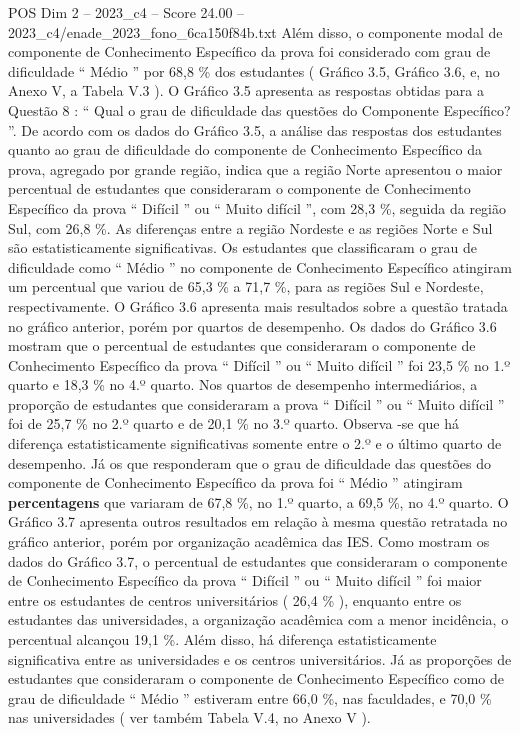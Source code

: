 \begin{textsample}{POS Dim 2 – 2023\_c4 – Score 24.00 – 2023\_c4/enade\_2023\_fono\_6ca150f84b.txt}
Além disso, o componente modal de componente de Conhecimento Específico da prova foi considerado com grau de dificuldade “ Médio ” por 68,8 \% dos estudantes ( Gráfico 3.5, Gráfico 3.6, e, no Anexo V, a Tabela V.3 ).
O Gráfico 3.5 apresenta as respostas obtidas para a Questão 8 : “ Qual o grau de dificuldade das questões do Componente Específico? ”.
De acordo com os dados do Gráfico 3.5, a análise das respostas dos estudantes quanto ao grau de dificuldade do componente de Conhecimento Específico da prova, agregado por grande região, indica que a região Norte apresentou o maior percentual de estudantes que consideraram o componente de Conhecimento Específico da prova “ Difícil ” ou “ Muito difícil ”, com 28,3 \%, seguida da região Sul, com 26,8 \%.
As diferenças entre a região Nordeste e as regiões Norte e Sul são estatisticamente significativas.
Os estudantes que classificaram o grau de dificuldade como “ Médio ” no componente de Conhecimento Específico atingiram um percentual que variou de 65,3 \% a 71,7 \%, para as regiões Sul e Nordeste, respectivamente.
O Gráfico 3.6 apresenta mais resultados sobre a questão tratada no gráfico anterior, porém por quartos de desempenho.
Os dados do Gráfico 3.6 mostram que o percentual de estudantes que consideraram o componente de Conhecimento Específico da prova “ Difícil ” ou “ Muito difícil ” foi 23,5 \% no 1.º quarto e 18,3 \% no 4.º quarto.
Nos quartos de desempenho intermediários, a proporção de estudantes que consideraram a prova “ Difícil ” ou “ Muito difícil ” foi de 25,7 \% no 2.º quarto e de 20,1 \% no 3.º quarto.
Observa -se que há diferença estatisticamente significativas somente entre o 2.º e o último quarto de desempenho.
Já os que responderam que o grau de dificuldade das questões do componente de Conhecimento Específico da prova foi “ Médio ” atingiram \textbf{percentagens} que variaram de 67,8 \%, no 1.º quarto, a 69,5 \%, no 4.º quarto.
O Gráfico 3.7 apresenta outros resultados em relação à mesma questão retratada no gráfico anterior, porém por organização acadêmica das IES.
Como mostram os dados do Gráfico 3.7, o percentual de estudantes que consideraram o componente de Conhecimento Específico da prova “ Difícil ” ou “ Muito difícil ” foi maior entre os estudantes de centros universitários ( 26,4 \% ), enquanto entre os estudantes das universidades, a organização acadêmica com a menor incidência, o percentual alcançou 19,1 \%.
Além disso, há diferença estatisticamente significativa entre as universidades e os centros universitários.
Já as proporções de estudantes que consideraram o componente de Conhecimento Específico como de grau de dificuldade “ Médio ” estiveram entre 66,0 \%, nas faculdades, e 70,0 \% nas universidades ( ver também Tabela V.4, no Anexo V ).

\end{textsample}
